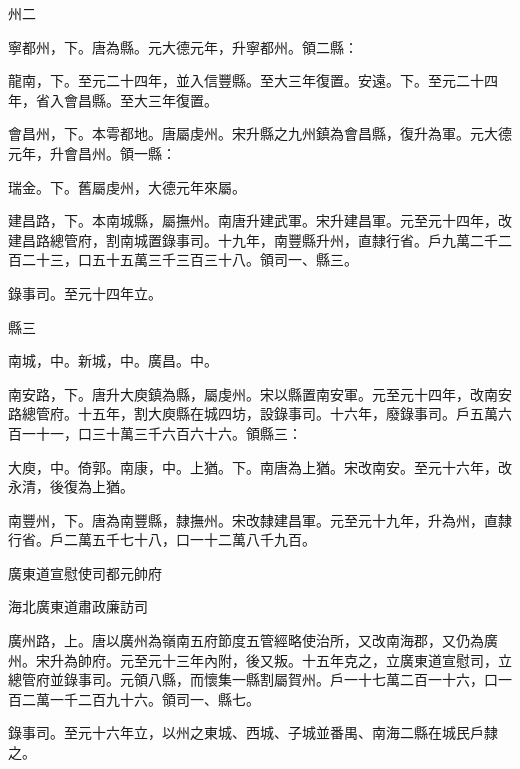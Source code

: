 \begin{pinyinscope}
 州二



 寧都州，下。唐為縣。元大德元年，升寧都州。領二縣：



 龍南，下。至元二十四年，並入信豐縣。至大三年復置。安遠。下。至元二十四年，省入會昌縣。至大三年復置。



 會昌州，下。本雩都地。唐屬虔州。宋升縣之九州鎮為會昌縣，復升為軍。元大德元年，升會昌州。領一縣：



 瑞金。下。舊屬虔州，大德元年來屬。



 建昌路，下。本南城縣，屬撫州。南唐升建武軍。宋升建昌軍。元至元十四年，改建昌路總管府，割南城置錄事司。十九年，南豐縣升州，直隸行省。戶九萬二千二百二十三，口五十五萬三千三百三十八。領司一、縣三。



 錄事司。至元十四年立。



 縣三



 南城，中。新城，中。廣昌。中。



 南安路，下。唐升大庾鎮為縣，屬虔州。宋以縣置南安軍。元至元十四年，改南安路總管府。十五年，割大庾縣在城四坊，設錄事司。十六年，廢錄事司。戶五萬六百一十一，口三十萬三千六百六十六。領縣三：



 大庾，中。倚郭。南康，中。上猶。下。南唐為上猶。宋改南安。至元十六年，改永清，後復為上猶。



 南豐州，下。唐為南豐縣，隸撫州。宋改隸建昌軍。元至元十九年，升為州，直隸行省。戶二萬五千七十八，口一十二萬八千九百。



 廣東道宣慰使司都元帥府



 海北廣東道肅政廉訪司



 廣州路，上。唐以廣州為嶺南五府節度五管經略使治所，又改南海郡，又仍為廣州。宋升為帥府。元至元十三年內附，後又叛。十五年克之，立廣東道宣慰司，立總管府並錄事司。元領八縣，而懷集一縣割屬賀州。戶一十七萬二百一十六，口一百二萬一千二百九十六。領司一、縣七。



 錄事司。至元十六年立，以州之東城、西城、子城並番禺、南海二縣在城民戶隸之。




\end{pinyinscope}
